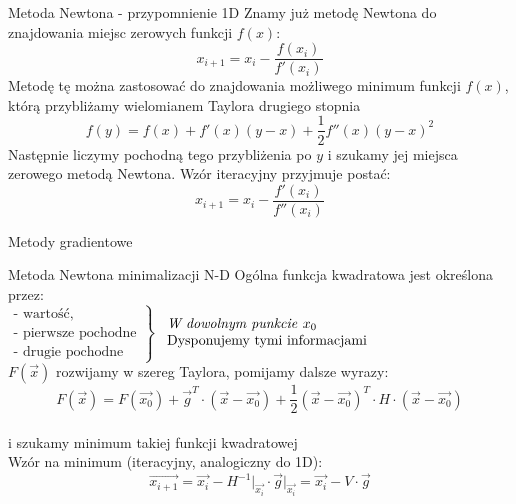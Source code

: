 \begin{frame}{Metoda Newtona - przypomnienie 1D}
Znamy już metodę Newtona do znajdowania miejsc zerowych funkcji $f(x)$:
$$
x_{i+1}=x_i - \frac{f(x_i)}{f'(x_i)}
$$
Metodę tę można zastosować do znajdowania  możliwego minimum funkcji $f(x)$, którą przybliżamy wielomianem Taylora drugiego stopnia 
$$
f(y)=f(x)+f'(x)(y-x)+\frac{1}{2}f''(x)(y-x)^2
$$
Następnie liczymy pochodną  tego przybliżenia po $y$ i szukamy jej miejsca zerowego metodą Newtona. Wzór iteracyjny przyjmuje postać:
$$
x_{i+1}=x_i - \frac{f'(x_i)}{f''(x_i)}
$$
\end{frame}
  \begin{frame}{Metody gradientowe}

    \begin{block}{Metoda Newtona minimalizacji N-D}
      Ogólna funkcja kwadratowa jest określona przez:
      \\$\left.
        \begin{array}{l}
          \text{- wartość,} \\
          \text{- pierwsze pochodne} \\
          \text{- drugie pochodne}
	    \end{array}
	  \right\}$
	  $\begin{array}{l} \text{\emph{W dowolnym punkcie }} x_0 \\
     \text{Dysponujemy tymi informacjami} \end{array}$\\
    $F(\vec{x})$ rozwijamy w szereg Taylora, pomijamy dalsze wyrazy:
	  \begin{displaymath}
	  		F(\vec{x}) = F(\vec{x_0}) + \vec{g}^T \cdot (\vec{x} - \vec{x_0}) +
	  		\frac{1}{2} (\vec{x} - \vec{x_0})^T \cdot H \cdot (\vec{x} - \vec{x_0})
	  \end{displaymath}
	  \\i szukamy minimum takiej funkcji kwadratowej
	  \\Wzór na minimum (iteracyjny, analogiczny do 1D):
	  \begin{displaymath}
	  		\vec{x_{i+1}} = \vec{x_i} - H^{-1}\vert_{\vec{x_i}} \cdot \vec{g}\vert_{\vec{x_i}} =  \vec{x_i} - V \cdot \vec{g}
	  \end{displaymath}
	\end{block}

  \end{frame}

